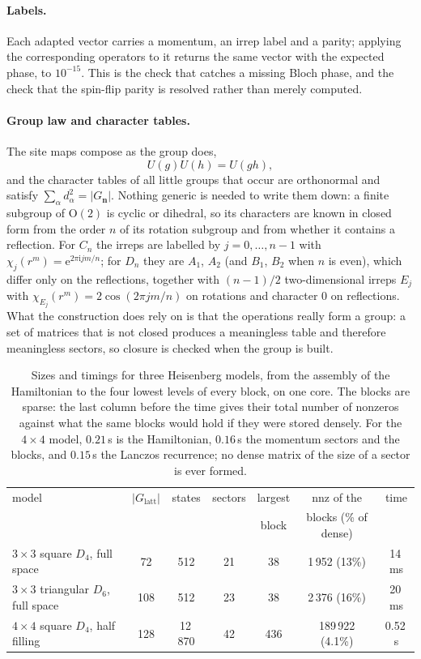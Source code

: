 \documentclass[12pt]{article}
\newcommand{\Glatt}{G_{\mathrm{latt}}}
\newcommand{\Gk}{G_{\mathbf{n}}}
\newcommand{\ee}{\mathrm{e}}
\newcommand{\ii}{\mathrm{i}}
\begin{document}
\paragraph{Labels.} Each adapted vector carries a momentum, an irrep label and a
parity; applying the corresponding operators to it returns the same vector with
the expected phase, to $10^{-15}$. This is the check that catches a missing Bloch
phase, and the check that the spin-flip parity is resolved rather than merely
computed.

\paragraph{Group law and character tables.} The site maps compose as the group
does,
\begin{equation}
  U(g)U(h) = U(gh),
\end{equation}
and the character tables of all little groups that occur are orthonormal and
satisfy $\sum_\alpha d_\alpha^2 = |\Gk|$. Nothing generic is needed to write them
down: a finite subgroup of $\mathrm{O}(2)$ is cyclic or dihedral, so its
characters are known in closed form from the order $n$ of its rotation subgroup
and from whether it contains a reflection. For $C_n$ the irreps are labelled by
$j = 0,\dots,n-1$ with $\chi_j(r^m) = \ee^{2\pi \ii j m/n}$; for $D_n$ they are
$A_1$, $A_2$ (and $B_1$, $B_2$ when $n$ is even), which differ only on the
reflections, together with $(n-1)/2$ two-dimensional irreps
$E_j$ with $\chi_{E_j}(r^m) = 2\cos(2\pi j m/n)$ on rotations and character $0$ on
reflections. What the construction does rely on is that the operations really form
a group: a set of matrices that is not closed produces a meaningless table and
therefore meaningless sectors, so closure is checked when the group is built.

\begin{table}[t]
\centering
\footnotesize
\begin{tabular}{lcccccc}
\toprule
model & $|\Glatt|$ & states & sectors & largest & nnz of the & time \\
 & & & & block & blocks (\% of dense) & \\
\midrule
$3\times3$ square $D_4$, full space & 72 & 512 & 21 & 38 & 1\,952 (13\%) & 14\,ms \\
$3\times3$ triangular $D_6$, full space & 108 & 512 & 23 & 38 & 2\,376 (16\%) & 20\,ms \\
$4\times4$ square $D_4$, half filling & 128 & 12\,870 & 42 & 436 & 189\,922 (4.1\%) & 0.52\,s \\
\bottomrule
\end{tabular}
\caption{Sizes and timings for three Heisenberg models, from the assembly of the
Hamiltonian to the four lowest levels of every block, on one core. The blocks are
sparse: the last column before the time gives their total number of nonzeros
against what the same blocks would hold if they were stored densely. For the
$4\times4$ model, $0.21\,$s is the Hamiltonian, $0.16\,$s the momentum sectors and
the blocks, and $0.15\,$s the Lanczos recurrence; no dense matrix of the size of a
sector is ever formed.}
\label{tab:sizes}
\end{table}
\end{document}

